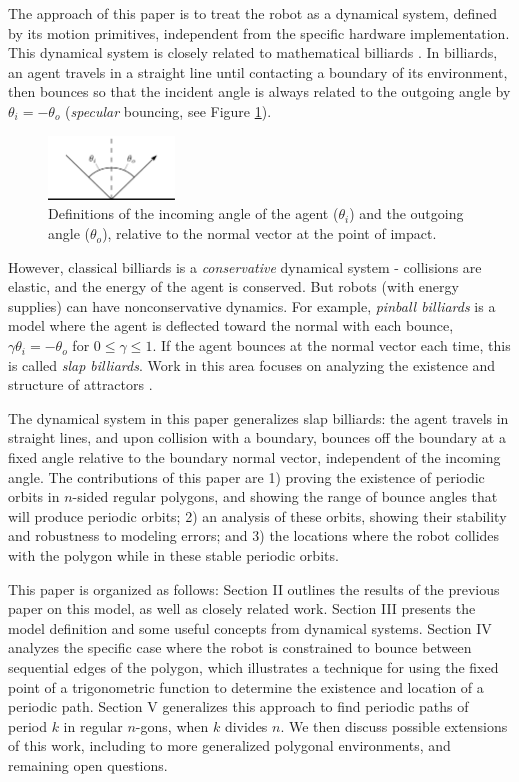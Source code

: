 \documentclass[letterpaper, 10 pt, conference]{ieeeconf}  %
\begin{document}
The approach of this paper is to treat the robot as a dynamical system, defined
by its motion primitives, independent from the specific hardware implementation.
This dynamical system is closely related to mathematical billiards
\cite{billiards}. In billiards, an agent travels in a straight line until
contacting a boundary of its environment, then bounces so that the incident
angle is always related to the outgoing angle by $\theta_{i} = -\theta_{o}$
(\textit{specular} bouncing, see Figure \ref{bounce_def}).

\begin{figure}[thpb]
  \centering
  \includegraphics[width=0.3\textwidth]{figs/bounce_def.pdf}
  \caption{Definitions of the incoming angle of the
agent ($\theta_i$) and the outgoing angle ($\theta_o$), relative to the normal
vector at the point of impact.}
  \label{bounce_def}
\end{figure}

However, classical billiards is a \textit{conservative} dynamical system -
collisions are elastic, and the energy of the agent is conserved. But
robots (with energy supplies) can have nonconservative dynamics. For example, 
\textit{pinball billiards} is a model where the agent is deflected toward the
normal with each bounce, $\gamma \theta_{i} = - \theta_{o}$ for
$0 \leq \gamma \leq 1$. If the agent bounces at the normal vector
each time, this is called \textit{slap billiards}. Work in this area focuses on
analyzing the existence and structure of attractors \cite{pinball} \cite{DelMagno2014}.

The dynamical system in this paper generalizes slap billiards: the agent travels
in straight lines, and upon collision with a boundary, bounces off the boundary
at a fixed angle relative to the boundary normal vector, independent of the
incoming angle. The contributions of this paper are 1) proving the existence of
periodic orbits in $n$-sided regular polygons, and showing the range of bounce
angles that will produce periodic orbits;
2) an analysis of these orbits, showing their stability and robustness to
modeling errors; and 3) the locations where the robot collides with the polygon while
in these stable periodic orbits.

This paper is organized as follows: Section II outlines the results of the
previous paper on this model, as well as closely related work.
Section III presents the model definition and
some useful concepts from dynamical systems. Section IV analyzes the specific
case where the robot is constrained to bounce between sequential edges of the
polygon, which illustrates a technique for using the fixed point of a
trigonometric function to determine the existence and location of a periodic path.
Section V generalizes this approach to find periodic paths of period $k$ in
regular $n$-gons, when $k$ divides $n$. We then discuss possible extensions
of this work, including to more generalized polygonal environments, and
remaining open questions.
\end{document}
